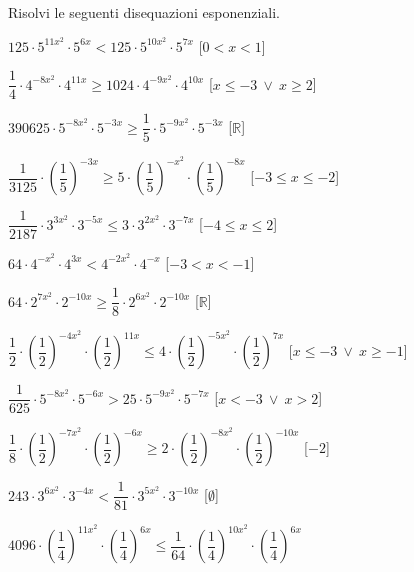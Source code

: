 \begin{esercizio}\label{ese:}
 Risolvi le seguenti disequazioni esponenziali.
 \begin{enumeratea}
  \item  \(125 \cdot 5^{{11x^2}} \cdot 5^{{6x}} < 125 \cdot 5^{{10x^2}} 
\cdot 5^{{7x}}\)
   \hfill [\(0 < x < 1\)]
  \item  \(\dfrac{1}{4} \cdot 4^{{-8x^2}} \cdot 4^{{11x}} \geqslant 1024 
\cdot 4^{{-9x^2}} \cdot 4^{{10x}}\)
   \hfill [\(x \leqslant -3~\vee~x \geqslant 2\)]
  \item  \(390625 \cdot 5^{{-8x^2}} \cdot 5^{{-3x}} \geqslant \dfrac{1}{5} 
\cdot 5^{{-9x^2}} \cdot 5^{{-3x}}\)
   \hfill [\(\mathbb{R}\)]
  \item  \(\dfrac{1}{3125} \cdot \left(\dfrac{1}{5}\right)^{{-3x}} 
\geqslant 
5 \cdot \left(\dfrac{1}{5}\right)^{{-x^2}} \cdot 
\left(\dfrac{1}{5}\right)^{{-8x}}\)
   \hfill [\(-3 \leqslant x \leqslant -2\)]
  \item  \(\dfrac{1}{2187} \cdot 3^{{3x^2}} \cdot 3^{{-5x}} \leqslant 3 
\cdot 3^{{2x^2}} \cdot 3^{{-7x}}\)
   \hfill [\(-4 \leqslant x \leqslant 2\)]
  \item  \(64 \cdot 4^{{-x^2}} \cdot 4^{{3x}} < 4^{{-2x^2}} \cdot 4^{{-x}}\)
   \hfill [\(-3 < x < -1\)]
  \item  \(64 \cdot 2^{{7x^2}} \cdot 2^{{-10x}} \geqslant \dfrac{1}{8} 
\cdot 
2^{{6x^2}} \cdot 2^{{-10x}}\)
   \hfill [\(\mathbb{R}\)]
  \item  \(\dfrac{1}{2} \cdot \left(\dfrac{1}{2}\right)^{{-4x^2}} \cdot 
\left(\dfrac{1}{2}\right)^{{11x}} \leqslant 4 \cdot 
\left(\dfrac{1}{2}\right)^{{-5x^2}} \cdot \left(\dfrac{1}{2}\right)^{{7x}}\)
   \hfill [\(x \leqslant -3~\vee~x \geqslant -1\)]
  \item  \(\dfrac{1}{625} \cdot 5^{{-8x^2}} \cdot 5^{{-6x}} > 25 \cdot 
5^{{-9x^2}} \cdot 5^{{-7x}}\)
   \hfill [\(x < -3~\vee~x > 2\)]
  \item  \(\dfrac{1}{8} \cdot \left(\dfrac{1}{2}\right)^{{-7x^2}} \cdot 
\left(\dfrac{1}{2}\right)^{{-6x}} \geqslant 2 \cdot 
\left(\dfrac{1}{2}\right)^{{-8x^2}} \cdot 
\left(\dfrac{1}{2}\right)^{{-10x}}\)
   \hfill [\(-2\)]
  \item  \(243 \cdot 3^{{6x^2}} \cdot 3^{{-4x}} < \dfrac{1}{81} \cdot 
3^{{5x^2}} \cdot 3^{{-10x}}\)
   \hfill [\(\emptyset\)]
  \item  \(4096 \cdot \left(\dfrac{1}{4}\right)^{{11x^2}} \cdot 
\left(\dfrac{1}{4}\right)^{{6x}} \leqslant \dfrac{1}{64} \cdot 
\left(\dfrac{1}{4}\right)^{{10x^2}} \cdot \left(\dfrac{1}{4}\right)^{{6x}}\)

\end{enumeratea}
\end{esercizio}
